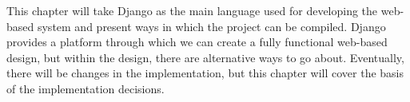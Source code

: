 \documentclass[../main.tex]{subfiles}
\begin{document}
\raggedright
This chapter will take Django as the main language used for developing the web-based system and present ways in which the project can be compiled. Django provides a platform through which we can create a fully functional web-based design, but within the design, there are alternative ways to go about. Eventually, there will be changes in the implementation, but this chapter will cover the basis of the implementation decisions. 
\end{document}

